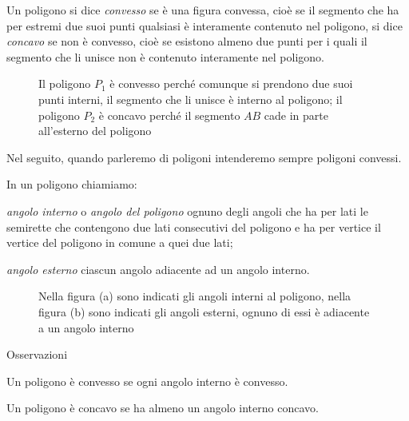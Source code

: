 \begin{definizione}
Un poligono si dice \emph{convesso} se è una figura convessa, cioè se 
il segmento che ha per estremi due suoi punti qualsiasi è interamente 
contenuto nel poligono, si dice \emph{concavo} se non è convesso, 
cioè se esistono almeno due punti per i quali il segmento che li 
unisce non è contenuto interamente nel poligono.
\end{definizione}


\begin{inaccessibleblock}
 \begin{figure}[htb]
\centering
\caption{Il poligono $P_1$ è convesso perché comunque si prendono due 
suoi punti interni, il segmento che li unisce è interno al poligono; 
il poligono $P_2$ è concavo perché il segmento $AB$ cade in parte 
all'esterno del poligono}
\end{figure}
\end{inaccessibleblock}

Nel seguito, quando parleremo di poligoni intenderemo sempre poligoni 
convessi.

\begin{definizione}
In un poligono chiamiamo:
\begin{itemize*}
\item \emph{angolo interno} o \emph{angolo del poligono} ognuno degli 
angoli che ha per lati le semirette che contengono due lati 
consecutivi del poligono e ha per vertice il vertice del poligono in 
comune a quei due lati;
\item \emph{angolo esterno} ciascun angolo adiacente ad un angolo 
interno.
\end{itemize*}
\end{definizione}


\begin{inaccessibleblock}
 \begin{figure}[htb]
\centering
\caption{Nella figura (a) sono indicati gli angoli interni al 
poligono, nella figura (b) sono indicati gli angoli esterni, ognuno 
di essi è adiacente a un angolo interno}
\end{figure}
\end{inaccessibleblock}

Osservazioni
\begin{itemize*}
\item Un poligono è convesso se ogni angolo interno è convesso.
\item Un poligono è concavo se ha almeno un angolo interno concavo.
\end{itemize*}

